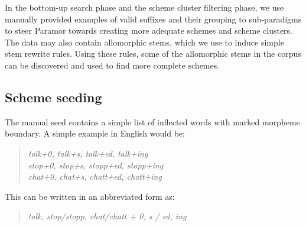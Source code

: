 \documentclass{itatnew}
\newcommand{\e}[1]{\textit{#1}} %
\newcommand{\todoja}[1]{[\textbf{TODOJ} #1]}
\begin{document}
In the bottom-up search phase and the scheme cluster filtering phase, we use manually provided examples of valid suffixes and their grouping to sub-paradigms to steer Paramor towards creating more adequate schemes and scheme clusters. The data may also contain allomorphic stems, which we use to induce simple stem rewrite rules. Using these rules, some of the allomorphic stems in the corpus can be discovered and used to find more complete schemes. %




\subsection{Scheme seeding}


\noindent
The manual seed contains a simple list of inflected words with marked morpheme boundary. A simple example in English would be:
\begin{quote}
\e{talk+0, talk+s, talk+ed, talk+ing}\\
\e{stop+0, stop+s, stopp+ed, stopp+ing}\\
\e{chat+0, chat+s, chatt+ed, chatt+ing}
%
\end{quote}

\noindent
This can be written in an abbreviated form as:

\begin{quote}
\e{talk, stop/stopp, chat/chatt +  0, s / ed, ing}
\end{quote}
\end{document}
